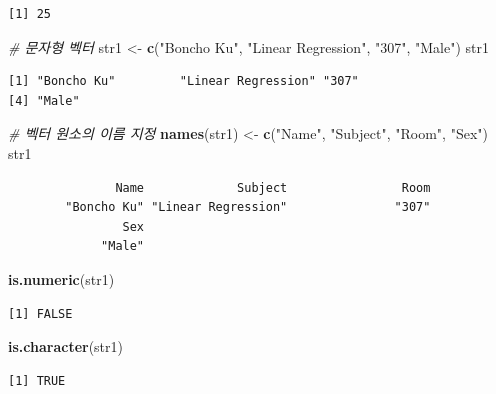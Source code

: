 \documentclass[11pt,a4paper]{book}
\newenvironment{Shaded}{\begin{snugshade}}{\end{snugshade}}
\newcommand{\KeywordTok}[1]{\textcolor[rgb]{0.13,0.29,0.53}{\textbf{#1}}}
\newcommand{\StringTok}[1]{\textcolor[rgb]{0.31,0.60,0.02}{#1}}
\newcommand{\CommentTok}[1]{\textcolor[rgb]{0.56,0.35,0.01}{\textit{#1}}}
\newcommand{\NormalTok}[1]{#1}
\theoremstyle{definition}
\theoremstyle{definition}
\theoremstyle{definition}
\theoremstyle{remark}
\begin{document}
\begin{verbatim}
[1] 25
\end{verbatim}

\begin{Shaded}
\begin{Highlighting}[]
\CommentTok{# 문자형 벡터}
\NormalTok{str1 <-}\StringTok{ }\KeywordTok{c}\NormalTok{(}\StringTok{"Boncho Ku"}\NormalTok{, }\StringTok{"Linear Regression"}\NormalTok{, }\StringTok{"307"}\NormalTok{, }\StringTok{"Male"}\NormalTok{)}
\NormalTok{str1}
\end{Highlighting}
\end{Shaded}

\begin{verbatim}
[1] "Boncho Ku"         "Linear Regression" "307"              
[4] "Male"             
\end{verbatim}

\begin{Shaded}
\begin{Highlighting}[]
\CommentTok{# 벡터 원소의 이름 지정}
\KeywordTok{names}\NormalTok{(str1) <-}\StringTok{ }\KeywordTok{c}\NormalTok{(}\StringTok{"Name"}\NormalTok{, }\StringTok{"Subject"}\NormalTok{, }\StringTok{"Room"}\NormalTok{, }\StringTok{"Sex"}\NormalTok{)}
\NormalTok{str1}
\end{Highlighting}
\end{Shaded}

\begin{verbatim}
               Name             Subject                Room 
        "Boncho Ku" "Linear Regression"               "307" 
                Sex 
             "Male" 
\end{verbatim}

\begin{Shaded}
\begin{Highlighting}[]
\KeywordTok{is.numeric}\NormalTok{(str1)}
\end{Highlighting}
\end{Shaded}

\begin{verbatim}
[1] FALSE
\end{verbatim}

\begin{Shaded}
\begin{Highlighting}[]
\KeywordTok{is.character}\NormalTok{(str1)}
\end{Highlighting}
\end{Shaded}

\begin{verbatim}
[1] TRUE
\end{verbatim}
\end{document}
